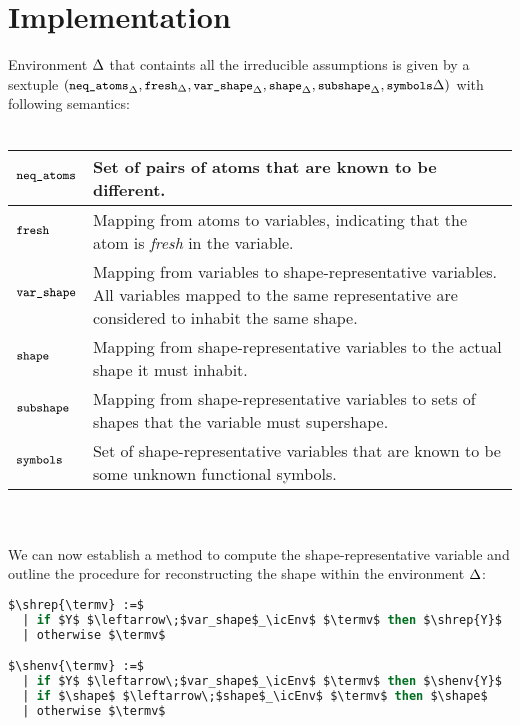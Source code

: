 \documentclass[english, mgr]{iithesis}
\renewcommand{\tt}[1]{\texttt{\small{#1}}}
\renewcommand{\it}[1]{\textit{#1}}
\begin{document}
\section{Implementation}
\newcommand{\NeqAtoms}{\tt{neq\_atoms}}
\newcommand{\Fresh}{\tt{fresh}}
\newcommand{\VarShape}{\tt{var\_shape}}
\newcommand{\Shape}{\tt{shape}}
\newcommand{\Subshape}{\tt{subshape}}
\newcommand{\Symbols}{\tt{symbols}}
\newcommand{\TransferShape}{\tt{transfer\_shape}}
\newcommand{\occurs}[2]{\ensuremath{ {#1}\text{ occurs in }{#2}}}
\newcommand{\stxoccurs}[2]{\ensuremath{ {#1}\text{ occurs syntactically in }{#2}}}
\newcommand{\pluseq}{\mathrel{+}=}
\newcommand{\minuseq}{\mathrel{-}=}
Environment $\Delta$ that containts all the irreducible assumptions is given by
a sextuple
$(\NeqAtoms_{\icEnv}
, \Fresh_{\icEnv}
, \VarShape_{\icEnv}
, \Shape_{\icEnv}
, \Subshape_{\icEnv}
, \Symbols{\icEnv}
)$ with following semantics:
\\ \\
\begin{tabularx}{\textwidth}{|l|X|}
\hline
$\NeqAtoms$ & Set of pairs of atoms that are known to be different. \\
\hline
$\Fresh$ & Mapping from atoms to variables, indicating that the atom is \it{fresh} in the variable. \\
\hline
$\VarShape$ & Mapping from variables to shape-representative variables. All variables mapped to the same representative are considered to inhabit the same shape. \\
\hline
$\Shape$ & Mapping from shape-representative variables to the actual shape it must inhabit. \\
\hline
$\Subshape$ & Mapping from shape-representative variables to sets of shapes that the variable must supershape. \\
\hline
$\Symbols$ & Set of shape-representative variables that are known to be some unknown functional symbols. \\
\hline
\end{tabularx}
\\ \\
\newcommand{\shrep}[2][\icEnv]{\ensuremath{ #2_{#1}}}
\newcommand{\shenv}[2][\icEnv]{\ensuremath{ |#2|_{#1}}}
We can now establish a method to compute the shape-representative variable and
outline the procedure for reconstructing the shape within the environment $\Delta$:\\
\noindent
\begin{minipage}{0.5\textwidth}
\begin{lstlisting}[mathescape, language=OCaml]
$\shrep{\termv} :=$
  | if $Y$ $\leftarrow\;$var_shape$_\icEnv$ $\termv$ then $\shrep{Y}$
  | otherwise $\termv$

$\shenv{\termv} :=$
  | if $Y$ $\leftarrow\;$var_shape$_\icEnv$ $\termv$ then $\shenv{Y}$
  | if $\shape$ $\leftarrow\;$shape$_\icEnv$ $\termv$ then $\shape$
  | otherwise $\termv$

\end{lstlisting}
\end{minipage}
\end{document}
